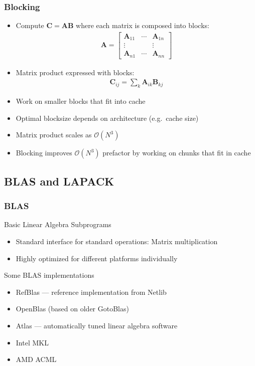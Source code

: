 \documentclass[usenames,dvipsnames,mathserif,compress]{beamer}
\begin{document}
\begin{frame}
  \frametitle{Blocking}
  \begin{itemize}
  \item
  Compute $\mathbf C = \mathbf A \mathbf B$ where each matrix is composed into
  blocks:
  \begin{align}
    \mathbf A = \left[
      \begin{matrix}
        \mathbf A_{11} &\cdots& \mathbf A_{1n}\\
        \vdots & & \vdots \\
        \mathbf A_{n1} & \cdots & \mathbf A_{nn}
      \end{matrix}\right]\nonumber
  \end{align}

\item Matrix product expressed with blocks:
  \begin{align}
    \mathbf C_{ij} = \sum_{k} \mathbf A_{ik} \mathbf B_{kj}\nonumber
  \end{align}
  \item Work on smaller blocks that fit into cache
  \item Optimal blocksize depends on architecture (e.g.\ cache size)
  \item Matrix product scales as $\mathcal O(N^3)$
  \item Blocking improves $\mathcal O(N^3)$ prefactor by working on
    chunks that fit in cache
  \end{itemize}
\end{frame}

\subsection*{BLAS and LAPACK}

\begin{frame}
  \frametitle{BLAS}
  \begin{block}{Basic Linear Algebra Subprograms}
  \end{block}
  \begin{itemize}
  \item Standard interface for standard operations:
    Matrix multiplication
  \item Highly optimized for different platforms individually
  \end{itemize}
  \begin{block}{Some BLAS implementations}
    \begin{itemize}
    \item RefBlas --- reference implementation from Netlib
    \item OpenBlas (based on older GotoBlas)
    \item Atlas --- automatically tuned linear algebra software
    \item Intel MKL
    \item AMD ACML
    \end{itemize}
  \end{block}
\end{frame}
\end{document}
